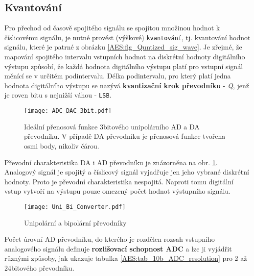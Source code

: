     \subsection{Kvantování}
       Pro přechod od časově spojitého signálu se spojitou množinou hodnot k číslicovému signálu, 
       je nutné provést (výškové) \texttt{kvantování}, tj. kvantování hodnot signálu, které je 
       patrné z obrázku \ref{AES:fig_Quntized_sig_wave}. Je zřejmé, že mapování spojitého intervalu 
       vstupních hodnot na diskrétní hodnoty digitálního výstupu způsobí, že každá hodnota 
       digitálního výstupu platí pro vstupní signál měnící se v určitém  podintervalu. Délka 
       podintervalu, pro který platí jedna hodnota digitálního výstupu se nazývá 
       \textbf{kvantizační krok převodníku} - \emph{Q}, jenž je roven bitu s nejnižší váhou - 
       \texttt{LSB}.

       \begin{figure}[ht!]
         \centering
         \texttt{[image: ADC\_DAC\_3bit.pdf]}
         \caption[Přenosová funkce AD a DA převodníku]{Ideální přenosová funkce 3bitového    
                  unipolárního AD a DA převodníku. V případě DA převodníku je přenosová funkce 
                  tvořena osmi body, nikoliv čárou.}
         \label{AES:fig_3b_DAC_ADC}
       \end{figure}
 
       Převodní charakteristika DA i AD převodníku je znázorněna na obr. \ref{AES:fig_3b_DAC_ADC}. 
       Analogový signál je spojitý a číslicový signál vyjadřuje jen jeho vybrané diskrétní hodnoty. 
       Proto je převodní charakteristika nespojitá. Naproti tomu digitální vstup vytvoří na výstupu 
       pouze omezený počet hodnot výstupního signálu.

       \begin{figure}[ht!]
         \centering
         \texttt{[image: Uni\_Bi\_Converter.pdf]}
         \caption[Unipolární a bipolární převodníky]{Unipolární a bipolární převodníky \cite{Kester2004}}
         \label{AES:fig_uni_bi_converter}
       \end{figure}

       Počet úrovní AD převodníku, do kterého je rozdělen rozsah vstupního analogového signálu 
       definuje \textbf{rozlišovací schopnost ADC} a lze ji vyjádřit různými způsoby, jak ukazuje 
       tabulka \ref{AES:tab_10b_ADC_resolution} pro 2 až 24bitového převodníku.

